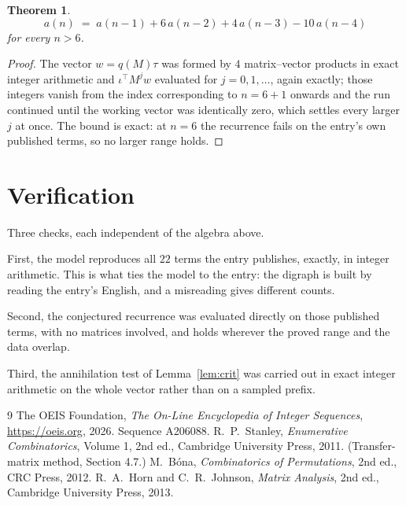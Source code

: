 \documentclass[11pt,a4paper]{article}
\theoremstyle{plain}
\newtheorem{theorem}{Theorem}
\theoremstyle{definition}
\begin{document}
\begin{theorem}
\[
a(n)\;=\;a(n-1) + 6\,a(n-2) + 4\,a(n-3) - 10\,a(n-4)
\]
for every $n>6$.
\end{theorem}

\begin{proof}
The vector $w=q(M)\tau$ was formed by $4$ matrix--vector products in exact integer
arithmetic and $\iota^{\!\top}M^{j}w$ evaluated for $j=0,1,\dots$, again exactly; those
integers vanish from the index corresponding to $n=6+1$ onwards and the run continued
until the working vector was identically zero, which settles every larger $j$ at once. The bound is exact: at $n=6$ the recurrence fails on the entry's own published terms, so no larger range holds.
\end{proof}

\section{Verification}

Three checks, each independent of the algebra above.

First, the model reproduces all $22$ terms the entry publishes, exactly, in integer
arithmetic. This is what ties the model to the entry: the digraph is built by reading the
entry's English, and a misreading gives different counts.

Second, the conjectured recurrence was evaluated directly on those published terms, with no
matrices involved, and holds wherever the proved range and the data overlap.

Third, the annihilation test of Lemma~\ref{lem:crit} was carried out in exact integer
arithmetic on the whole vector rather than on a sampled prefix.

\begin{thebibliography}{9}
 The OEIS Foundation, \emph{The On-Line Encyclopedia of Integer
Sequences}, \url{https://oeis.org}, 2026. Sequence A206088.
 R.~P.~Stanley, \emph{Enumerative Combinatorics}, Volume 1, 2nd ed.,
Cambridge University Press, 2011. (Transfer-matrix method, Section 4.7.)
 M.~B\'ona, \emph{Combinatorics of Permutations}, 2nd ed., CRC
Press, 2012.
 R.~A.~Horn and C.~R.~Johnson, \emph{Matrix Analysis}, 2nd ed., Cambridge
University Press, 2013.
\end{thebibliography}
\end{document}

